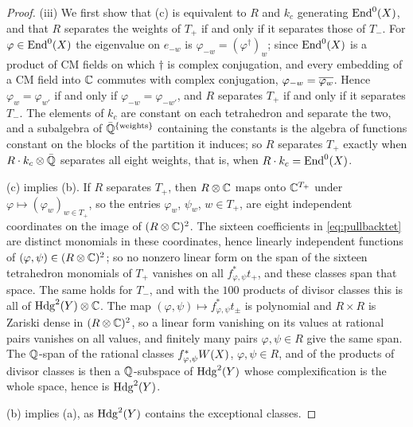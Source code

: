 \begin{proof}
(iii) We first show that (c) is equivalent to $R$ and $k_{c}$ generating
$\operatorname{End}^{0}(X)$, and that $R$ separates the weights of $T_{+}$ if and only if
it separates those of $T_{-}$. For $\varphi\in\operatorname{End}^{0}(X)$ the eigenvalue on
$e_{-w}$ is $\varphi_{-w}=(\varphi^{\dagger})_{w}$; since $\operatorname{End}^{0}(X)$ is a
product of CM fields on which $\dagger$ is complex conjugation, and every
embedding of a CM field into $\mathbb{C}$ commutes with complex conjugation,
$\varphi_{-w}=\overline{\varphi_{w}}$. Hence $\varphi_{w}=\varphi_{w'}$ if and
only if $\varphi_{-w}=\varphi_{-w'}$, and $R$ separates $T_{+}$ if and only
if it separates $T_{-}$. The elements of $k_{c}$ are constant on each
tetrahedron and separate the two, and a subalgebra of
$\bar{\mathbb{Q}}^{\{\text{weights}\}}$ containing the constants is the algebra of
functions constant on the blocks of the partition it induces; so $R$
separates $T_{+}$ exactly when $R\cdot k_{c}\otimes\bar{\mathbb{Q}}$ separates all
eight weights, that is, when $R\cdot k_{c}=\operatorname{End}^{0}(X)$.

(c) implies (b). If $R$ separates $T_{+}$, then $R\otimes\mathbb{C}$ maps onto
$\mathbb{C}^{T_{+}}$ under $\varphi\mapsto(\varphi_{w})_{w\in T_{+}}$, so the
entries $\varphi_{w}$, $\psi_{w}$, $w\in T_{+}$, are eight independent
coordinates on the image of $(R\otimes\mathbb{C})^{2}$. The sixteen coefficients in
\eqref{eq:pullbacktet} are distinct monomials in these coordinates, hence
linearly independent functions of $(\varphi,\psi)\in(R\otimes\mathbb{C})^{2}$; so
no nonzero linear form on the span of the sixteen tetrahedron monomials of
$T_{+}$ vanishes on all $f_{\varphi,\psi}^{*}t_{+}$, and these classes span
that space. The same holds for $T_{-}$, and with the $100$ products of
divisor classes this is all of $\mathrm{Hdg}^{2}(Y)\otimes\mathbb{C}$. The map
$(\varphi,\psi)\mapsto f_{\varphi,\psi}^{*}t_{\pm}$ is polynomial and
$R\times R$ is Zariski dense in $(R\otimes\mathbb{C})^{2}$, so a linear form
vanishing on its values at rational pairs vanishes on all values, and
finitely many pairs $\varphi,\psi\in R$ give the same span. The $\mathbb{Q}$-span of
the rational classes $f_{\varphi,\psi}^{*}W(X)$, $\varphi,\psi\in R$, and
of the products of divisor classes is then a $\mathbb{Q}$-subspace of
$\mathrm{Hdg}^{2}(Y)$ whose complexification is the whole space, hence is
$\mathrm{Hdg}^{2}(Y)$.

(b) implies (a), as $\mathrm{Hdg}^{2}(Y)$ contains the exceptional classes.


\end{proof}
